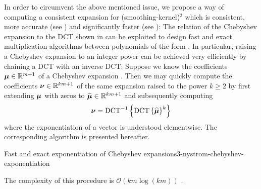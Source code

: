 In order to circumvent the above mentioned issue, we propose a way of computing
a consistent expansion for (\gls{smoothing-kernel})$^2$ which is consistent,
more accurate (see ) and significantly
faster (see ):
The relation of the Chebyshev expansion to the \gls{DCT} shown in 
can be exploited to design fast and exact multiplication algorithms between polynomials
of the form  \cite[proposition~3.1]{baszenski1997cosine}.
In particular, raising a Chebyshev expansion to an integer power can be achieved
very efficiently by chaining a \gls{DCT} with an inverse \gls{DCT}:
Suppose we know the coefficients $\boldsymbol{\mu} \in \mathbb{R}^{m+1}$
of a Chebyshev expansion .
Then we may quickly compute the coefficients $\boldsymbol{\nu} \in \mathbb{R}^{km+1}$
of the same expansion raised to the power $k \geq 2$ by first extending
$\boldsymbol{\mu}$ with zeros to $\widehat{\boldsymbol{\mu}} \in \mathbb{R}^{km+1}$
and subsequently computing
\begin{equation}
    \boldsymbol{\nu} = \operatorname{DCT}^{-1}\left\{ \operatorname{DCT}\left\{\widehat{\boldsymbol{\mu}}\right\}^{k} \right\}
    \label{equ:3-nystrom-chebyshev-potentiate-coefficients}
\end{equation}
where the exponentiation of a vector is understood elementwise.
The corresponding algorithm is presented hereafter.
\begin{algo}{Fast and exact exponentiation of Chebyshev expansions}{3-nystrom-chebyshev-exponentiation}
    
\end{algo}
The complexity of this procedure is $\mathcal{O}(km \log(km))$ \cite{makhoul1980fct}.\\
\begin{table}[ht]
    \caption{Comparison of the runtime in milliseconds of the two approaches with which the coefficients
    of the Chebyshev expansion of a function. We average over 7 runs of the
    algorithms and repeat these runs 100 times to form the mean and standard
    deviation which are given in the below table. We refer to the interpolation
    of (\gls{smoothing-kernel})$^{2}$ with \cite[algorithm~1]{lin2017randomized} as \enquote{quadrature},
    to the interpolation of (\gls{smoothing-kernel})$^{2}$ with  as \enquote{DCT},
    and finally to the fast squaring algorithm  as \enquote{squaring}.
    For each algorithm, we interpolate a Gaussian \gls{smoothing-kernel} with \gls{smoothing-parameter} $=0.05$,
    at \gls{num-evaluation-points} $=1000$ points, for various values of \gls{chebyshev-degree}.}
    \label{tab:3-nystrom-timing-squared-interpolation}
    
\end{table}

